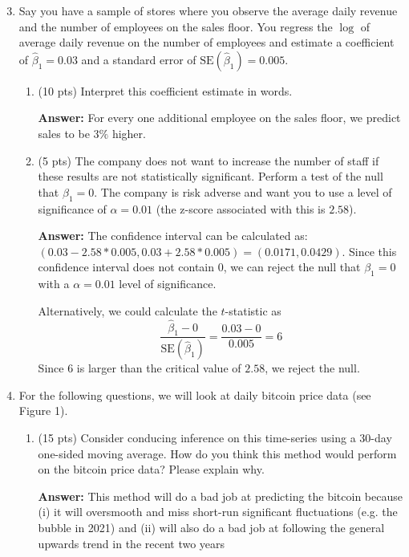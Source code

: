 \documentclass[12pt]{article}
\newcommand{\answer}[1]{{\color{blue_winged_teal}\textbf{Answer:} #1}}
\newcommand{\pts}[1]{{\color{zinc500}(#1 pts)}}
\begin{document}
\newpage
\begin{enumerate}
  \setcounter{enumi}{2}
  \item Say you have a sample of stores where you observe the average daily revenue and the number of employees on the sales floor. You regress the $\log$ of average daily revenue on the number of employees and estimate a coefficient of $\hat{\beta}_1 = 0.03$ and a standard error of $\text{SE}(\hat{\beta}_1) = 0.005$. 
  \begin{enumerate}
    \item \pts{10} Interpret this coefficient estimate in words.
    
    \answer{
      For every one additional employee on the sales floor, we predict sales to be $3\%$ higher.
    }
    
    \item \pts{5} The company does not want to increase the number of staff if these results are not statistically significant. Perform a test of the null that $\beta_1 = 0$. The company is risk adverse and want you to use a level of significance of $\alpha = 0.01$ (the z-score associated with this is $2.58$). 
    
    \answer{
      The confidence interval can be calculated as: $(0.03 - 2.58 * 0.005, 0.03 + 2.58 * 0.005) = (0.0171, 0.0429)$. Since this confidence interval does not contain $0$, we can reject the null that $\beta_1 = 0$ with a $\alpha = 0.01$ level of significance.

      Alternatively, we could calculate the $t$-statistic as 
      $$
        \frac{\hat{\beta}_1 - 0}{\text{SE}(\hat{\beta}_1)} = \frac{0.03 - 0}{0.005} = 6
      $$
      Since $6$ is larger than the critical value of $2.58$, we reject the null.
    }
  \end{enumerate}
  
  \bigskip
  \item For the following questions, we will look at daily bitcoin price data (see Figure 1).
  \begin{enumerate}
    \item \pts{15} Consider conducing inference on this time-series using a 30-day one-sided moving average. How do you think this method would perform on the bitcoin price data? Please explain why.
    
    \answer{
      This method will do a bad job at predicting the bitcoin because (i) it will oversmooth and miss short-run significant fluctuations (e.g. the bubble in 2021) and (ii) will also do a bad job at following the general upwards trend in the recent two years 
    }
    

\end{enumerate}
\end{enumerate}
\end{document}
